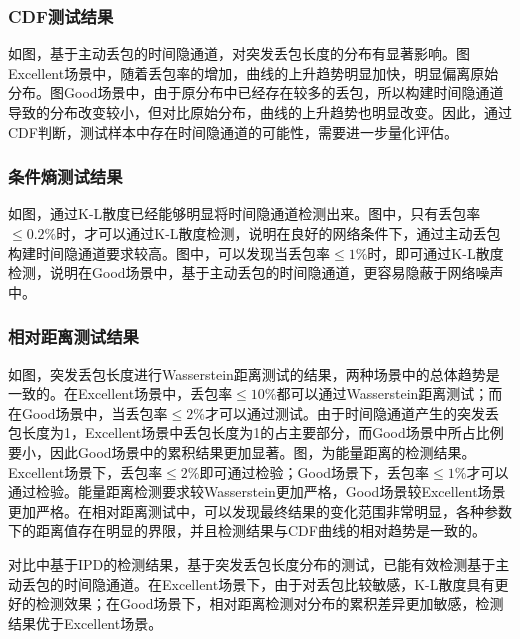\subsubsection{CDF测试结果}
\label{chap:analyze:result:burst:cdf}

如图，基于主动丢包的时间隐通道，对突发丢包长度的分布有显著影响。图Excellent场景中，随着丢包率的增加，曲线的上升趋势明显加快，明显偏离原始分布。图Good场景中，由于原分布中已经存在较多的丢包，所以构建时间隐通道导致的分布改变较小，但对比原始分布，曲线的上升趋势也明显改变。因此，通过CDF判断，测试样本中存在时间隐通道的可能性，需要进一步量化评估。

\subsubsection{条件熵测试结果}
\label{chap:analyze:result:burst:kld}

如图，通过K-L散度已经能够明显将时间隐通道检测出来。图中，只有丢包率$\le 0.2\%$时，才可以通过K-L散度检测，说明在良好的网络条件下，通过主动丢包构建时间隐通道要求较高。图中，可以发现当丢包率$\le 1\%$时，即可通过K-L散度检测，说明在Good场景中，基于主动丢包的时间隐通道，更容易隐蔽于网络噪声中。

\subsubsection{相对距离测试结果}
\label{chap:analyze:result:burst:distance}

如图，突发丢包长度进行Wasserstein距离测试的结果，两种场景中的总体趋势是一致的。在Excellent场景中，丢包率$\le 10\%$都可以通过Wasserstein距离测试；而在Good场景中，当丢包率$\le 2\%$才可以通过测试。由于时间隐通道产生的突发丢包长度为1，Excellent场景中丢包长度为1的占主要部分，而Good场景中所占比例要小，因此Good场景中的累积结果更加显著。图，为能量距离的检测结果。Excellent场景下，丢包率$\le 2\%$即可通过检验；Good场景下，丢包率$\le 1\%$才可以通过检验。能量距离检测要求较Wasserstein更加严格，Good场景较Excellent场景更加严格。在相对距离测试中，可以发现最终结果的变化范围非常明显，各种参数下的距离值存在明显的界限，并且检测结果与CDF曲线的相对趋势是一致的。

对比中基于IPD的检测结果，基于突发丢包长度分布的测试，已能有效检测基于主动丢包的时间隐通道。在Excellent场景下，由于对丢包比较敏感，K-L散度具有更好的检测效果；在Good场景下，相对距离检测对分布的累积差异更加敏感，检测结果优于Excellent场景。

